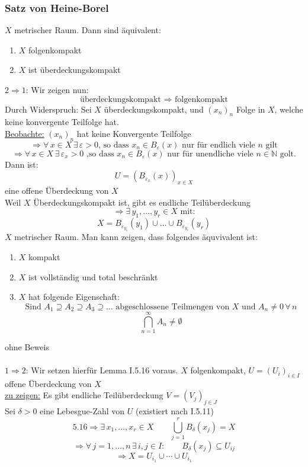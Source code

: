 \subsubsection{Satz von Heine-Borel} %
\label{ssub:satz_von_heine_borel}
$X$ metrischer Raum. Dann sind äquivalent:
\begin{enumerate}
	\item $X$ folgenkompakt
	\item $X$ ist überdeckungskompakt
\end{enumerate}
\underline{$2 \Rightarrow 1$}:
Wir zeigen nun:
\[
	\text{überdeckungskompakt } \Rightarrow \text{ folgenkompakt}
\]
Durch Widerspruch: Sei $X$ überdeckungskompakt, und $(x_n)_n$ Folge in $X$, welche keine konvergente Teilfolge hat. \\
\underline{Beobachte:}
$(x_n)_n$ hat keine Konvergente Teilfolge
\[
	\Rightarrow \forall\, x \in X \,\exists\, \varepsilon>0 \text{, so dass }x_n \in B_{\varepsilon}(x) \text{ nur für endlich viele $n$ gilt}
\]
\[
	\Rightarrow \forall\, x \in X \,\exists\, \varepsilon_x>0 \text{ ,so dass }x_n \in B_{\varepsilon}(x) \text{ nur für unendliche viele $n \in \mathbb{N}$ golt.}
\]
Dann ist:
\[
	U = (B_{\varepsilon_x}(x))_{x \in X} 
\]
eine offene Überdeckung von $X$ \\
Weil $X$ Überdeckungskompakt ist, gibt es endliche Teilüberdeckung
\[
	\Rightarrow  \exists\,y_1,\dots,y_r \in X \text{ mit:}
\]
\[
	X = B_{\varepsilon_{y_1}}(y_1) \cup \dots \cup B_{\varepsilon_{y_r}}(y_r)
\]
\bewende
{}
$X$ metrischer Raum. Man kann zeigen, dass folgendes äquvivalent ist:
\begin{enumerate}
	\item $X$ kompakt
	\item $X$ ist vollständig und total beschränkt
	\item $X$ hat folgende Eigenschaft:
	\[
		\text{Sind }   A_1  \supseteq A_2 \supseteq A_3 \supseteq \dots \text{ abgeschlossene Teilmengen von $X$ und }A_n \neq 0 \, \forall\, n
		\]
		\[
			\bigcap\limits_{n=1}^{\infty}A_n \neq \emptyset
		\]
\end{enumerate}
ohne Beweis \\
\\
\underline{$1 \Rightarrow 2$}: Wir setzen hierfür Lemma I.5.16 voraus.
$X$ folgenkompakt, $U=(U_i)_{i \in I}$ offene Überdeckung von $X$ \\
\underline{zu zeigen:} Es gibt endliche Teilüberdeckung $V=(V_j)_{j \in J}$ \\
Sei $\delta>0$ eine Lebesgue-Zahl von $U$ (existiert nach I.5.11)
\[
	5.16 \Rightarrow \exists\, x_1, \dots, x_r \in X \qquad \bigcup\limits_{j=1}^r B_{\delta}(x_j)=X
\]
\[
	\Rightarrow \forall\, j=1,\dots,n \, \exists\, i,j \in I: \qquad B_{\delta}(x_j) \subseteq U_{ij}
\]
\[
	\Rightarrow X = U_{i_1} \cup \cdots \cup U_{i_1}
\]
\bewende

